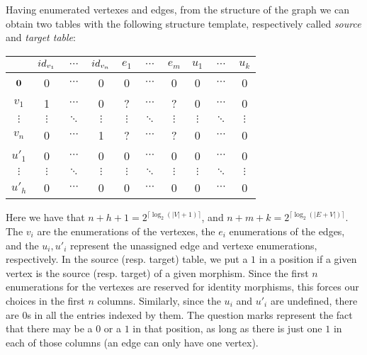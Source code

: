 \documentclass[submission,copyright,creativecommons,sharealike,noncommercial]{eptcs}
\begin{document}
Having enumerated vertexes and edges, from the structure of 
the graph we can obtain two tables with the following structure 
template, respectively called \emph{source} and \emph{target table}:
%
%
\begin{center}\scriptsize
  \begin{tabular}{c|ccccccccc}
                  & $id_{v_1}$ & $\cdots$ & $id_{v_n}$ & $e_1$     & $\cdots$ & $e_m$    & $u_1$     & $\cdots$ & $u_k$   \\
  \hline
  $\textbf{0}$   & 0                 & $\cdots$ & 0                  & 0             & $\cdots$ & 0             & 0             & $\cdots$ & 0             \\
  $v_1$      & 1                 & $\cdots$ & 0                  & ?             & $\cdots$ & ?             & 0             & $\cdots$ & 0             \\
  $\vdots $ & $\vdots$     & $\ddots$ & $\vdots$      & $\vdots$ & $\ddots$ & $\vdots$ & $\vdots$ & $\ddots$ & $\vdots$  \\
  $v_n$      & 0                 & $\cdots$ & 1                  & ?             & $\cdots$ & ?             & 0             & $\cdots$ & 0             \\
  $u'_1$     & 0                 & $\cdots$ & 0                  & 0             & $\cdots$ & 0             & 0             & $\cdots$ & 0             \\
  $\vdots$  & $\vdots$     & $\ddots$ & $\vdots$      & $\vdots$ & $\ddots$ & $\vdots$ & $\vdots$ & $\ddots$ & $\vdots$ \\
  $u'_h$     & 0                 & $\cdots$ & 0                  & 0             & $\cdots$ &0             & 0             & $\cdots$ & 0             \\
  \end{tabular}
\end{center}
%
Here we have that $n+h+1 = 2^{\lceil \log_2 (|V|+1) \rceil}$, 
and $n+m+k = 2^{\lceil \log_2 (|E+V|) \rceil}$. The $v_i$ are 
the enumerations of the vertexes, the $e_i$ enumerations 
of the edges, and the $u_i, u'_i$ represent the unassigned 
edge and vertexe enumerations, respectively. In the source (resp. target) 
table, we put a $1$ in a position if a given vertex is the source (resp. target)
of a given morphism. Since the first $n$ enumerations for the 
vertexes are reserved for identity morphisms, this forces our 
choices in the first $n$ columns. Similarly, since the $u_i$ and 
$u'_i$ are undefined, there are $0$s in all the entries indexed by them.
The question marks represent the fact that there may be a $0$ or a $1$
in that position, as long as there is just one $1$ in each of those 
columns (an edge can only have one vertex). 
%
%
%
\end{document}
